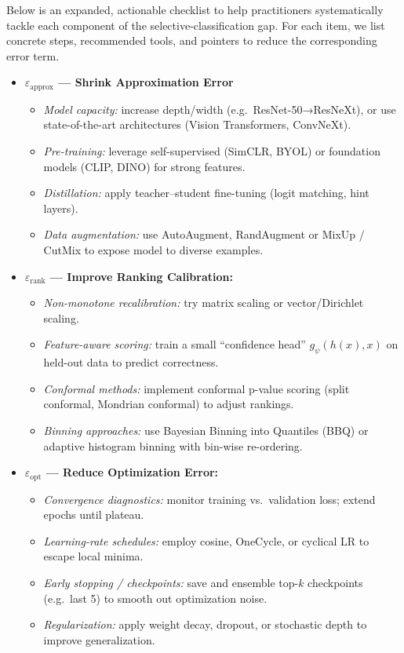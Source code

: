 Below is an expanded, actionable checklist to help practitioners systematically tackle each component of the selective-classification gap.  For each item, we list concrete steps, recommended tools, and pointers to reduce the corresponding error term.

\begin{itemize}[leftmargin=1.5em]

  \item \textbf{\(\varepsilon_{\text{approx}}\) — Shrink Approximation Error}
    \begin{itemize}[leftmargin=1.25em]
      \item \emph{Model capacity:} increase depth/width (e.g.\ ResNet-50→ResNeXt), or use state-of-the-art architectures (Vision Transformers, ConvNeXt).
      \item \emph{Pre-training:} leverage self-supervised (SimCLR, BYOL) or foundation models (CLIP, DINO) for strong features.
      \item \emph{Distillation:} apply teacher–student fine-tuning (logit matching, hint layers).
      \item \emph{Data augmentation:} use AutoAugment, RandAugment or MixUp / CutMix to expose model to diverse examples.
    \end{itemize}

  \item \textbf{\(\varepsilon_{\text{rank}}\) — Improve Ranking Calibration:}
    \begin{itemize}[leftmargin=1.25em]
      \item \emph{Non-monotone recalibration:} try matrix scaling or vector/Dirichlet scaling.
      \item \emph{Feature-aware scoring:} train a small “confidence head” \(g_\psi(h(x), x)\) on held-out data to predict correctness.
      \item \emph{Conformal methods:} implement conformal p-value scoring (split conformal, Mondrian conformal) to adjust rankings.
      \item \emph{Binning approaches:} use Bayesian Binning into Quantiles (BBQ) or adaptive histogram binning with bin-wise re-ordering.
    \end{itemize}

  \item \textbf{\(\varepsilon_{\text{opt}}\) — Reduce Optimization Error:}
    \begin{itemize}[leftmargin=1.25em]
      \item \emph{Convergence diagnostics:} monitor training vs.\ validation loss; extend epochs until plateau.
      \item \emph{Learning-rate schedules:} employ cosine, OneCycle, or cyclical LR to escape local minima.
      \item \emph{Early stopping / checkpoints:} save and ensemble top-\(k\) checkpoints (e.g.\ last 5) to smooth out optimization noise.
      \item \emph{Regularization:} apply weight decay, dropout, or stochastic depth to improve generalization.
    \end{itemize}


\end{itemize}
